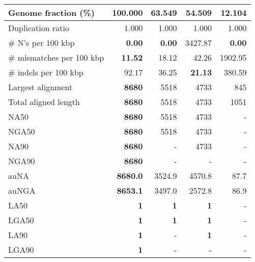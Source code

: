 \documentclass[12pt,a4paper]{article}
\begin{document}
\begin{table}[ht]
\begin{center}
\begin{tabular}{|l*{4}{|r}|}
Genome fraction (\%) & {\bf 100.000} & 63.549 & 54.509 & 12.104 \\ \hline
Duplication ratio & 1.000 & 1.000 & 1.000 & 1.000 \\ \hline
\# N's per 100 kbp & {\bf 0.00} & {\bf 0.00} & 3427.87 & {\bf 0.00} \\ \hline
\# mismatches per 100 kbp & {\bf 11.52} & 18.12 & 42.26 & 1902.95 \\ \hline
\# indels per 100 kbp & 92.17 & 36.25 & {\bf 21.13} & 380.59 \\ \hline
Largest alignment & {\bf 8680} & 5518 & 4733 & 845 \\ \hline
Total aligned length & {\bf 8680} & 5518 & 4733 & 1051 \\ \hline
NA50 & {\bf 8680} & 5518 & 4733 & - \\ \hline
NGA50 & {\bf 8680} & 5518 & 4733 & - \\ \hline
NA90 & {\bf 8680} & - & 4733 & - \\ \hline
NGA90 & {\bf 8680} & - & - & - \\ \hline
auNA & {\bf 8680.0} & 3524.9 & 4570.8 & 87.7 \\ \hline
auNGA & {\bf 8653.1} & 3497.0 & 2572.8 & 86.9 \\ \hline
LA50 & {\bf 1} & {\bf 1} & {\bf 1} & - \\ \hline
LGA50 & {\bf 1} & {\bf 1} & {\bf 1} & - \\ \hline
LA90 & {\bf 1} & - & {\bf 1} & - \\ \hline
LGA90 & {\bf 1} & - & - & - \\ \hline
\end{tabular}
\end{center}
\end{table}
\end{document}

